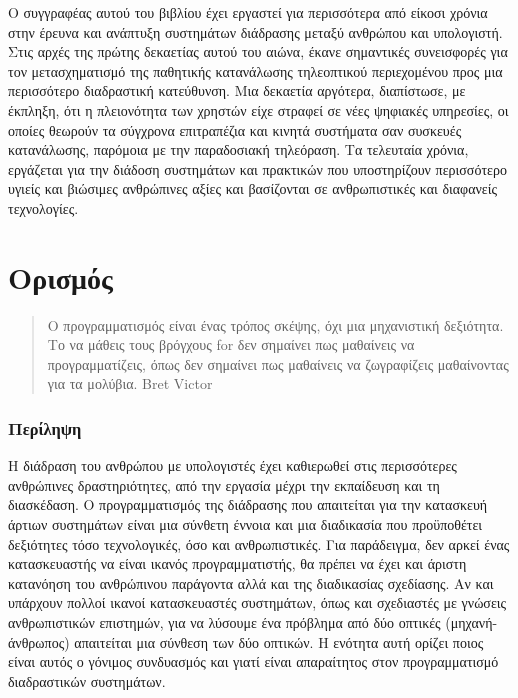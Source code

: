\documentclass[
]{article}
\begin{document}
Ο συγγραφέας αυτού του βιβλίου έχει εργαστεί για περισσότερα από είκοσι
χρόνια στην έρευνα και ανάπτυξη συστημάτων διάδρασης μεταξύ ανθρώπου και
υπολογιστή. Στις αρχές της πρώτης δεκαετίας αυτού του αιώνα, έκανε
σημαντικές συνεισφορές για τον μετασχηματισμό της παθητικής κατανάλωσης
τηλεοπτικού περιεχομένου προς μια περισσότερο διαδραστική κατεύθυνση.
Μια δεκαετία αργότερα, διαπίστωσε, με έκπληξη, ότι η πλειονότητα των
χρηστών είχε στραφεί σε νέες ψηφιακές υπηρεσίες, οι οποίες θεωρούν τα
σύγχρονα επιτραπέζια και κινητά συστήματα σαν συσκευές κατανάλωσης,
παρόμοια με την παραδοσιακή τηλεόραση. Τα τελευταία χρόνια, εργάζεται
για την διάδοση συστημάτων και πρακτικών που υποστηρίζουν περισσότερο
υγιείς και βιώσιμες ανθρώπινες αξίες και βασίζονται σε ανθρωπιστικές και
διαφανείς τεχνολογίες.

\hypertarget{ux3bfux3c1ux3b9ux3c3ux3bcux3ccux3c2}{%
\section{Ορισμός}\label{ux3bfux3c1ux3b9ux3c3ux3bcux3ccux3c2}}

\begin{quote}
Ο προγραμματισμός είναι ένας τρόπος σκέψης, όχι μια μηχανιστική
δεξιότητα. Το να μάθεις τους βρόγχους for δεν σημαίνει πως μαθαίνεις να
προγραμματίζεις, όπως δεν σημαίνει πως μαθαίνεις να ζωγραφίζεις
μαθαίνοντας για τα μολύβια. Bret Victor
\end{quote}

\hypertarget{ux3c0ux3b5ux3c1ux3afux3bbux3b7ux3c8ux3b7}{%
\subsubsection{Περίληψη}\label{ux3c0ux3b5ux3c1ux3afux3bbux3b7ux3c8ux3b7}}

Η διάδραση του ανθρώπου με υπολογιστές έχει καθιερωθεί στις περισσότερες
ανθρώπινες δραστηριότητες, από την εργασία μέχρι την εκπαίδευση και τη
διασκέδαση. Ο προγραμματισμός της διάδρασης που απαιτείται για την
κατασκευή άρτιων συστημάτων είναι μια σύνθετη έννοια και μια διαδικασία
που προϋποθέτει δεξιότητες τόσο τεχνολογικές, όσο και ανθρωπιστικές. Για
παράδειγμα, δεν αρκεί ένας κατασκευαστής να είναι ικανός
προγραμματιστής, θα πρέπει να έχει και άριστη κατανόηση του ανθρώπινου
παράγοντα αλλά και της διαδικασίας σχεδίασης. Αν και υπάρχουν πολλοί
ικανοί κατασκευαστές συστημάτων, όπως και σχεδιαστές με γνώσεις
ανθρωπιστικών επιστημών, για να λύσουμε ένα πρόβλημα από δύο οπτικές
(μηχανή-άνθρωπος) απαιτείται μια σύνθεση των δύο οπτικών. Η ενότητα αυτή
ορίζει ποιος είναι αυτός ο γόνιμος συνδυασμός και γιατί είναι
απαραίτητος στον προγραμματισμό διαδραστικών συστημάτων.
\end{document}
